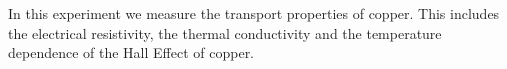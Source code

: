 In this experiment we measure the transport properties of copper. This includes the electrical resistivity, the thermal conductivity and the temperature dependence of the Hall Effect of copper.